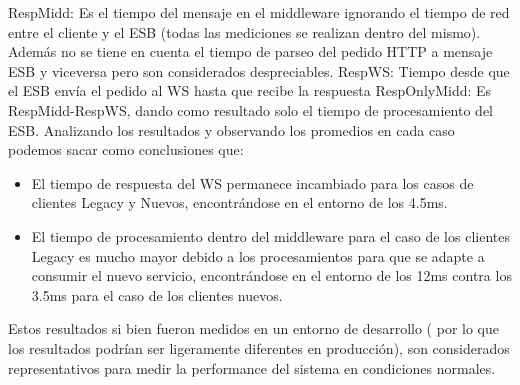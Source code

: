 \documentclass[12pt]{article}
\begin{document}
RespMidd: Es el tiempo del mensaje en el middleware ignorando el tiempo de red entre el cliente y el ESB (todas las mediciones se realizan dentro del mismo). Además no se tiene en cuenta el tiempo de parseo del pedido HTTP a mensaje ESB y viceversa pero son considerados despreciables.
RespWS: Tiempo desde que el ESB envía el pedido al WS hasta que recibe la respuesta
RespOnlyMidd: Es RespMidd-RespWS, dando como resultado solo el tiempo de procesamiento del ESB.
Analizando los resultados y observando los promedios en cada caso podemos sacar como conclusiones que:
\begin{itemize}
  \item El tiempo de respuesta del WS permanece incambiado para los casos de clientes Legacy y Nuevos, encontrándose en el entorno de los 4.5ms.
  \item El tiempo de procesamiento dentro del middleware para el caso de los clientes Legacy es mucho mayor debido a los procesamientos para que se adapte a consumir el nuevo servicio, encontrándose en el entorno de los 12ms contra los 3.5ms para el caso de los clientes nuevos.
\end{itemize}

Estos resultados si bien fueron medidos en un entorno de desarrollo ( por lo que los resultados podrían ser ligeramente diferentes en producción), son considerados representativos para medir la performance del sistema en condiciones normales.


%
%
\end{document}
